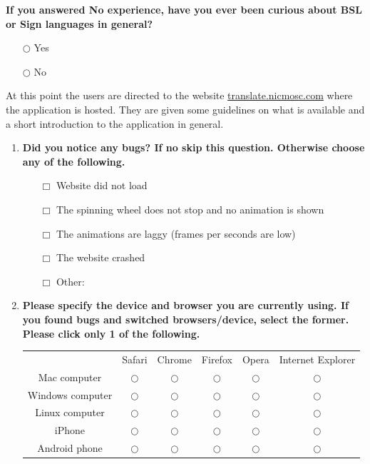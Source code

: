 \documentclass[12pt]{ociamthesis}  %
\begin{document}
{\begin{enumerate}
	\textbf{If you answered No experience, have you ever been curious about BSL or Sign languages in general?}
	\begin{enumerate}
		\item[$\bigcirc$] Yes
		\item[$\bigcirc$] No
	\end{enumerate}
\end{enumerate}

	\begin{mdframed}[hidealllines=true,backgroundcolor=blue!5] \par At this point the users are directed to the website \url{translate.nicmosc.com} where the application is hosted. They are given some guidelines on what is available and a short introduction to the application in general.
	\end{mdframed}

\begin{enumerate}[resume] %
	\item \textbf{Did you notice any bugs? If no skip this question. Otherwise choose any of the following.}
	\begin{enumerate}
		\item[$\Box$] Website did not load
		\item[$\Box$] The spinning wheel does not stop and no animation is shown
		\item[$\Box$] The animations are laggy (frames per seconds are low)
		\item[$\Box$] The website crashed
		\item[$\Box$] Other: \dotfill
	\end{enumerate}
	\item \textbf{Please specify the device and browser you are currently using.
If you found bugs and switched browsers/device, select the former. Please click only 1 of the following.}
	\begin{center}
	{\renewcommand{\arraystretch}{1.6}
	\begin{tabular}{c c c c c c}
	& Safari & Chrome & Firefox & Opera & Internet Explorer \\
	Mac computer & $\bigcirc$ & $\bigcirc$ & $\bigcirc$ & $\bigcirc$ & $\bigcirc$ \\
	\hline
	Windows computer & $\bigcirc$ & $\bigcirc$ & $\bigcirc$ & $\bigcirc$ & $\bigcirc$ \\
	\hline	
	Linux computer & $\bigcirc$ & $\bigcirc$ & $\bigcirc$ & $\bigcirc$ & $\bigcirc$ \\
	\hline	
	iPhone & $\bigcirc$ & $\bigcirc$ & $\bigcirc$ & $\bigcirc$ & $\bigcirc$ \\
	\hline	
	Android phone & $\bigcirc$ & $\bigcirc$ & $\bigcirc$ & $\bigcirc$ & $\bigcirc$ \\
	\end{tabular}
	}
	\end{center}
	

\end{enumerate}}
\end{document}
